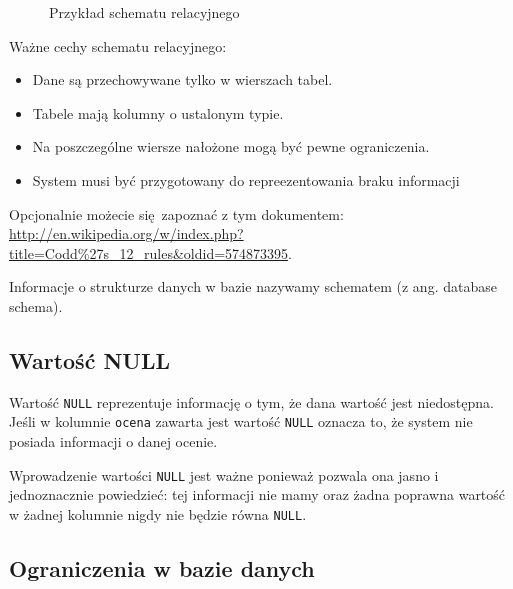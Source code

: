 \documentclass[a4paper]{article}
\begin{document}
\begin{figure}
\noindent{}
\caption{Przykład schematu relacyjnego}
\end{figure}

Ważne cechy schematu relacyjnego:
%
\begin{itemize}

\item Dane są przechowywane tylko w wierszach tabel.

\item Tabele mają kolumny o ustalonym typie.

\item Na poszczególne wiersze nałożone mogą być pewne ograniczenia.

\item System musi być przygotowany do repreezentowania \textquotedbl{}braku informacji\textquotedbl{}

\end{itemize}

Opcjonalnie możecie się~zapoznać z tym dokumentem: \url{http://en.wikipedia.org/w/index.php?title=Codd\%27s_12_rules&oldid=574873395}.

Informacje o strukturze danych w bazie nazywamy
schematem (z ang. database schema).


\subsection{Wartość NULL%
  \label{wartosc-null}%
}

Wartość \texttt{NULL} reprezentuje informację o tym, że dana wartość jest niedostępna.
Jeśli w kolumnie \texttt{ocena} zawarta jest wartość \texttt{NULL} oznacza to, że system nie posiada
informacji o danej ocenie.

Wprowadzenie wartości \texttt{NULL} jest ważne ponieważ pozwala ona jasno i jednoznacznie
powiedzieć: tej informacji nie mamy oraz żadna poprawna wartość w żadnej kolumnie
nigdy nie będzie równa \texttt{NULL}.


\subsection{Ograniczenia w bazie danych%
  \label{ograniczenia-w-bazie-danych}%
}
\end{document}
